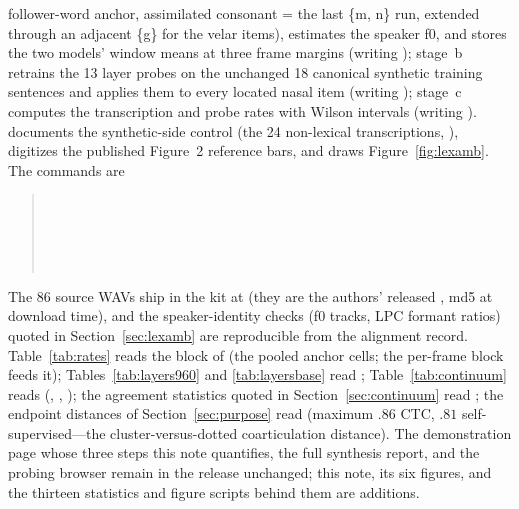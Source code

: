 \documentclass[11pt,a4paper]{article}
\begin{document}
follower-word anchor, assimilated consonant = the last \{m, n\}
run, extended through an adjacent \{g\} for the velar items),
estimates the speaker f0, and stores the two models' window means
at three frame margins (writing );
stage~b retrains the 13 layer probes on the unchanged 18 canonical
synthetic training sentences and applies them to every located
nasal item (writing ); stage~c
computes the transcription and probe rates with Wilson intervals
(writing ).
 documents the synthetic-side control
(the 24 non-lexical transcriptions, ),
 digitizes the published Figure~2
reference bars, and  draws
Figure~\ref{fig:lexamb}. The commands are
\begin{quote}
\footnotesize
{}\\
\\
\\
\\
\end{quote}
The 86 source WAVs ship in the kit at 
(they are the authors' released , md5
 at download time), and the
speaker-identity checks (f0 tracks, LPC formant ratios) quoted in
Section~\ref{sec:lexamb} are reproducible from the alignment
record.
Table~\ref{tab:rates} reads the  block of
 (the pooled anchor cells; the per-frame
 block feeds it); Tables~\ref{tab:layers960} and
\ref{tab:layersbase} read ;
Table~\ref{tab:continuum} reads 
(, , );
the agreement statistics quoted in Section~\ref{sec:continuum} read
; the endpoint distances of
Section~\ref{sec:purpose} read 
(maximum $.86$ CTC, $.81$ self-supervised---the cluster-versus-dotted
coarticulation distance). The demonstration page whose three steps this note
quantifies, the full synthesis report, and the probing browser remain
in the release unchanged; this note, its six figures, and the thirteen
statistics and figure scripts behind them are additions.
\end{document}
